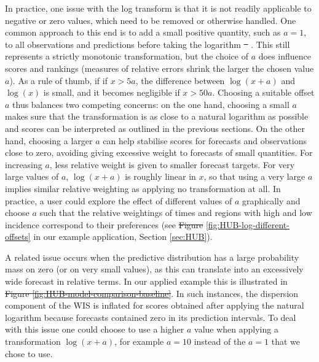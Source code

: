 \documentclass[10pt,letterpaper]{article} %
\providecommand{\DIFaddtex}[1]{{\protect\color{blue}\uwave{#1}}} %
\providecommand{\DIFdeltex}[1]{{\protect\color{red}\sout{#1}}}                      %
\providecommand{\DIFaddbegin}{} %
\providecommand{\DIFaddend}{} %
\providecommand{\DIFdelbegin}{} %
\providecommand{\DIFdelend}{} %
\providecommand{\DIFadd}[1]{\texorpdfstring{\DIFaddtex{#1}}{#1}} %
\providecommand{\DIFdel}[1]{\texorpdfstring{\DIFdeltex{#1}}{}} %
\newcommand{\DIFscaledelfig}{0.5}
\newlength{\DIFdelgraphicswidth} %
\newlength{\DIFdelgraphicsheight} %
\newcommand{\DIFaddincludegraphics}[2][]{{\color{blue}\fbox{\DIFOincludegraphics[#1]{#2}}}} %
\newcommand{\DIFdelincludegraphics}[2][]{%
\sbox{\DIFdelgraphicsbox}{\DIFOincludegraphics[#1]{#2}}%
\settoboxwidth{\DIFdelgraphicswidth}{\DIFdelgraphicsbox} %
\settoboxtotalheight{\DIFdelgraphicsheight}{\DIFdelgraphicsbox} %
\scalebox{\DIFscaledelfig}{%
\parbox[b]{\DIFdelgraphicswidth}{\usebox{\DIFdelgraphicsbox}\\[-\baselineskip] \rule{\DIFdelgraphicswidth}{0em}}\llap{\resizebox{\DIFdelgraphicswidth}{\DIFdelgraphicsheight}{%
\setlength{\unitlength}{\DIFdelgraphicswidth}%
\begin{picture}(1,1)%
\thicklines\linethickness{2pt} %
{\color[rgb]{1,0,0}\put(0,0){\framebox(1,1){}}}%
{\color[rgb]{1,0,0}\put(0,0){\line( 1,1){1}}}%
{\color[rgb]{1,0,0}\put(0,1){\line(1,-1){1}}}%
\end{picture}%
}\hspace*{3pt}}} %
} %
\DeclareRobustCommand{\DIFaddbegin}{\DIFOaddbegin \let\includegraphics\DIFaddincludegraphics} %
\DeclareRobustCommand{\DIFaddend}{\DIFOaddend \let\includegraphics\DIFOincludegraphics} %
\DeclareRobustCommand{\DIFdelbegin}{\DIFOdelbegin \let\includegraphics\DIFdelincludegraphics} %
\DeclareRobustCommand{\DIFdelend}{\DIFOaddend \let\includegraphics\DIFOincludegraphics} %
\begin{document}
In practice, one issue with the log transform is that it is not readily applicable to negative or zero values, which need to be removed or otherwise handled. 
One common approach to this end is to add a small positive quantity, such as $a = 1$, to all observations and predictions before taking the logarithm \DIFdelbegin \DIFdel{\mbox{%
\citep{bellegoDealingLogsZeros2022}}\hskip0pt%
}\DIFdelend \DIFaddbegin \DIFadd{\mbox{%
\cite{bellegoDealingLogsZeros2022}}\hskip0pt%
}\DIFaddend . This still represents a strictly monotonic transformation, but the choice of $a$ does influence scores and rankings (measures of relative errors shrink the larger the chosen value $a$). As a rule of thumb, if if $x > 5a$, the difference between $\log{(x + a)}$ and $\log{(x)}$ is small, and it becomes negligible if $x > 50a$. Choosing a suitable offset $a$ thus balances two competing concerns: on the one hand, choosing a small $a$ makes sure that the transformation is as close to a natural logarithm as possible and scores can be interpreted as outlined in the previous sections. On the other hand, choosing a larger $a$ can help stabilise scores for forecasts and observations close to zero, avoiding giving excessive weight to forecasts of small quantities. For increasing $a$, less relative weight is given to smaller forecast targets. For very large values of $a$, $\log(x + a)$ is roughly linear in $x$, so that using a very large $a$ implies similar relative weighting as applying no transformation at all. In practice, a user could explore the effect of different values of $a$ graphically and choose $a$ such that the relative weightings of times and regions with high and low incidence correspond to their preferences (see \DIFdelbegin \DIFdel{Figure }\DIFdelend \DIFaddbegin \DIFadd{Fig }\DIFaddend \ref{fig:HUB-log-different-offsets} in our example application, Section \ref{sec:HUB}).


A related issue occurs when the predictive distribution has a large probability mass on zero (or on very small values), as this can translate into an excessively wide forecast in relative terms. In our applied example this is illustrated in \DIFdelbegin \DIFdel{Figure \ref{fig:HUB-model-comparison-baseline}}\DIFdelend \DIFaddbegin {}\DIFaddend . In such instances, the dispersion component of the WIS is inflated for scores obtained after applying the natural logarithm because forecasts contained zero in its prediction intervals. To deal with this issue one could choose to use a higher $a$ value when applying a transformation $\log(x + a)$, for example $a = 10$ instead of the $a = 1$ that we chose to use.
\end{document}
